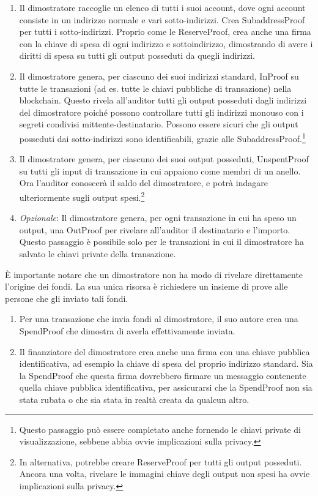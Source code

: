 \begin{enumerate}
    \item Il dimostratore raccoglie un elenco di tutti i suoi account, dove ogni account consiste in un indirizzo normale e vari sotto-indirizzi. Crea SubaddressProof per tutti i sotto-indirizzi. Proprio come le ReserveProof, crea anche una firma con la chiave di spesa di ogni indirizzo e sottoindirizzo, dimostrando di avere i diritti di spesa su tutti gli output posseduti da quegli indirizzi.
    \item Il dimostratore genera, per ciascuno dei suoi indirizzi standard, InProof su tutte le transazioni (ad es. tutte le chiavi pubbliche di transazione) nella blockchain. Questo rivela all'auditor tutti gli output posseduti dagli indirizzi del dimostratore poiché possono controllare tutti gli indirizzi monouso con i segreti condivisi mittente-destinatario. Possono essere sicuri che gli output posseduti dai sotto-indirizzi sono identificabili, grazie alle SubaddressProof.\footnote{Questo passaggio può essere completato anche fornendo le chiavi private di visualizzazione, sebbene abbia ovvie implicazioni sulla privacy.}
    \item Il dimostratore genera, per ciascuno dei suoi output posseduti, UnspentProof su tutti gli input di transazione in cui appaiono come membri di un anello. Ora l'auditor conoscerà il saldo del dimostratore, e potrà indagare ulteriormente sugli output spesi.\footnote{In alternativa, potrebbe creare ReserveProof per tutti gli output posseduti. Ancora una volta, rivelare le immagini chiave degli output non spesi ha ovvie implicazioni sulla privacy.}
    \item \emph{Opzionale}: Il dimostratore genera, per ogni transazione in cui ha speso un output, una OutProof per rivelare all'auditor il destinatario e l'importo. Questo passaggio è possibile solo per le transazioni in cui il dimostratore ha salvato le chiavi private della transazione.
\end{enumerate}{}

È importante notare che un dimostratore non ha modo di rivelare direttamente l'origine dei fondi. La sua unica risorsa è richiedere un insieme di prove alle persone che gli inviato tali fondi.

\begin{enumerate}
    \item Per una transazione che invia fondi al dimostratore, il suo autore crea una SpendProof che dimostra di averla effettivamente inviata.
    \item Il finanziatore del dimostratore crea anche una firma con una chiave pubblica identificativa, ad esempio la chiave di spesa del proprio indirizzo standard. Sia la SpendProof che questa firma dovrebbero firmare un messaggio contenente quella chiave pubblica identificativa, per assicurarsi che la SpendProof non sia stata rubata o che sia stata in realtà creata da qualcun altro.
\end{enumerate}{}